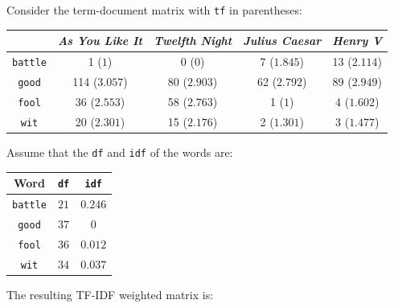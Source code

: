 \begin{description}
\begin{description}
                \begin{example}
                    Consider the term-document matrix with \texttt{tf} in parentheses:
                    \begin{table}[H]
                        \centering
                        \footnotesize
                        \begin{tabular}{ccccc}
                            \toprule
                            & \textit{As You Like It} & \textit{Twelfth Night} & \textit{Julius Caesar} & \textit{Henry V} \\
                            \midrule
                            \texttt{battle} & 1 ($1$) & 0 ($0$) & 7 ($1.845$) & 13 ($2.114$) \\
                            \texttt{good} & 114 ($3.057$) & 80 ($2.903$) & 62 ($2.792$) & 89 ($2.949$) \\
                            \texttt{fool} & 36 ($2.553$) & 58 ($2.763$) & 1 ($1$) & 4 ($1.602$) \\
                            \texttt{wit} & 20 ($2.301$) & 15 ($2.176$) & 2 ($1.301$) & 3 ($1.477$) \\
                            \bottomrule
                        \end{tabular}
                    \end{table}
                    Assume that the \texttt{df} and \texttt{idf} of the words are:
                    \begin{table}[H]
                        \centering
                        \footnotesize
                        \begin{tabular}{ccc}
                            \toprule
                            \textbf{Word} & \texttt{df} & \texttt{idf} \\
                            \midrule
                            \texttt{battle} & $21$ & $0.246$ \\
                            \texttt{good} & $37$ & $0$ \\
                            \texttt{fool} & $36$ & $0.012$ \\
                            \texttt{wit} & $34$ & $0.037$ \\
                            \bottomrule
                        \end{tabular}
                    \end{table}
                    The resulting TF-IDF weighted matrix is:
                    \begin{table}[H]

\end{table}
\end{example}
\end{description}
\end{description}
